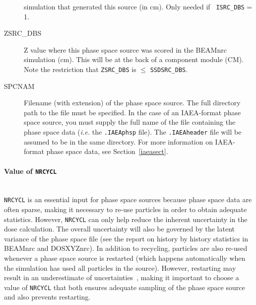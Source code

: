 \documentclass[12pt,twoside]{article}
\begin{document}
\begin{description}
simulation that generated this source (in cm). Only needed if {\tt
ISRC\_DBS} = 1.
\item [ZSRC\_DBS] Z value where this phase space source was scored
                     in the BEAMnrc simulation (cm).  This will be at the back
                     of a component module (CM).  Note the restriction that
                     {\tt ZSRC\_DBS} is $\leq$ {\tt SSDSRC\_DBS}.
\item [SPCNAM] Filename (with extension) of the phase space source. The full
directory path to the file must be specified.  In the
case of an IAEA-format phase space source, you must supply the full name
of the file containing the phase space data ({\em i.e.} the {\tt .IAEAphsp}
file).  The {\tt .IAEAheader} file will be assumed to be in the same
directory.  For more information on IAEA-format phase space data, see
Section~\ref{iaeasect}.
\end{description}

\paragraph{Value of {\tt NRCYCL}}\mbox{}\\
{\tt NRCYCL} is an essential input for phase space sources because
phase space data are often sparse, making it necessary to re-use particles
in order to obtain adequate statistics.  However, {\tt NRCYCL} can only
help reduce the inherent uncertainty in the dose calculation. The overall
uncertainty will also be governed by the latent variance of the phase space file (see the
report on history by history
statistics in BEAMnrc and DOSXYZnrc\cite{Wa02a}).
In addition to recycling, particles are also re-used whenever a phase space source is restarted
(which happens automatically when the simulation has used all particles in the
source).  However, restarting may result in an underestimate of
uncertainties~\cite{Wa02a}, making it important to choose a value
of {\tt NRCYCL} that both ensures adequate sampling of the phase space
source and also prevents restarting.
\end{document}
